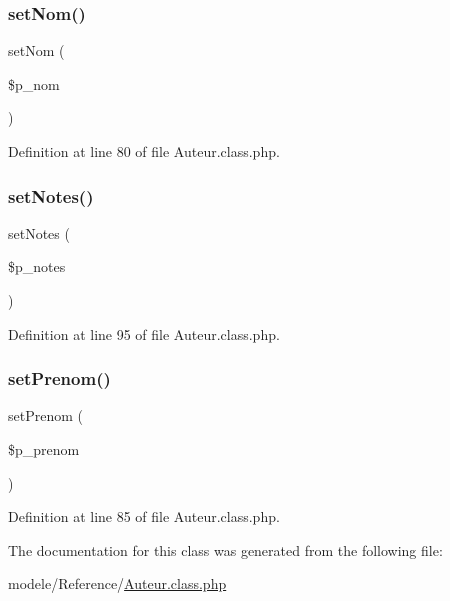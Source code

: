 \subsubsection{\texorpdfstring{set\+Nom()}{setNom()}}
{\footnotesize\ttfamily set\+Nom (\begin{DoxyParamCaption}\item[{}]{\$p\+\_\+nom }\end{DoxyParamCaption})}



Definition at line 80 of file Auteur.\+class.\+php.

\mbox{\label{class_auteur_ad24f8871d4dd1bf2c5d219fb09247758}} 
\subsubsection{\texorpdfstring{set\+Notes()}{setNotes()}}
{\footnotesize\ttfamily set\+Notes (\begin{DoxyParamCaption}\item[{}]{\$p\+\_\+notes }\end{DoxyParamCaption})}



Definition at line 95 of file Auteur.\+class.\+php.

\mbox{\label{class_auteur_a7bf9e7d18fd0cf6e38ffba353a5ad180}} 
\subsubsection{\texorpdfstring{set\+Prenom()}{setPrenom()}}
{\footnotesize\ttfamily set\+Prenom (\begin{DoxyParamCaption}\item[{}]{\$p\+\_\+prenom }\end{DoxyParamCaption})}



Definition at line 85 of file Auteur.\+class.\+php.



The documentation for this class was generated from the following file\+:\begin{DoxyCompactItemize}
\item 
modele/\+Reference/\hyperlink{_auteur_8class_8php}{Auteur.\+class.\+php}\end{DoxyCompactItemize}
